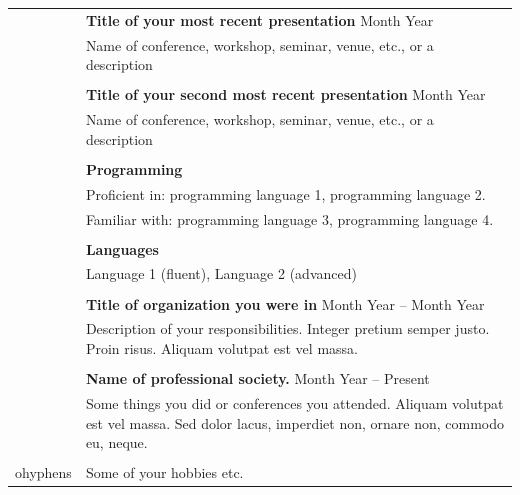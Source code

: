 \documentclass[letterpaper, 11pt]{article}
\begin{document}
\begin{longtable}{p{1.3in}p{4.8in}}

{\color{OliveGreen}{Talks and tutorials}} 
& \textbf{Title of your most recent presentation} \hfill Month Year \\
& Name of conference, workshop, seminar, venue, etc., or a description \\
& \\

& \textbf{Title of your second most recent presentation} \hfill Month Year \\
& Name of conference, workshop, seminar, venue, etc., or a description \\
& \\


{\color{OliveGreen}{Skills}} 
& \textbf{Programming}\\
& Proficient in: programming language 1, programming language 2. \\
& Familiar with: programming language 3, programming language 4. \\
& \\

& \textbf{Languages} \\
& Language 1 (fluent), Language 2 (advanced) \\
& \\


\color{OliveGreen}{Service and outreach}
& \textbf{Title of organization you were in} \hfill Month Year -- Month Year \\
& Description of your responsibilities. Integer pretium semper justo. Proin risus. Aliquam volutpat est vel massa. \\
& \\


{\color{OliveGreen}{Professional}} 
& {\textbf{Name of professional society.}} \hfill Month Year -- Present \\
{\color{OliveGreen}{memberships}} 
& Some things you did or conferences you attended. Aliquam volutpat est vel massa. Sed dolor lacus, imperdiet non, ornare non, commodo eu, neque. \\
& \\



ohyphens{\color{OliveGreen}{Other interests}} & Some of your hobbies etc.\\


\end{longtable}
\end{document}
